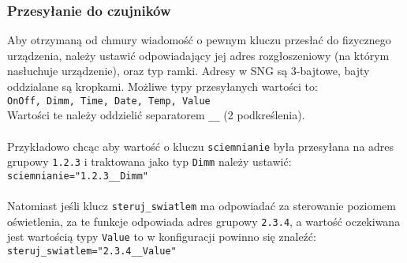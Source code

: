 \documentclass[11pt]{article}
\begin{document}
\subsubsection{Przesyłanie do czujników}
Aby otrzymaną od chmury wiadomość o pewnym kluczu przesłać do fizycznego urządzenia,
należy ustawić odpowiadający jej adres rozgłoszeniowy (na którym nasłuchuje urządzenie), 
oraz typ ramki. Adresy w SNG są 3-bajtowe, bajty oddzialane są kropkami. 
Możliwe typy przesyłanych wartości to:\\
\verb|OnOff, Dimm, Time, Date, Temp, Value|\\
Wartości te należy oddzielić separatorem \verb|__| (2 podkreślenia).\\
\\
Przykładowo chcąc aby wartość o kluczu \verb|sciemnianie| była przesyłana na adres
grupowy \verb|1.2.3| i traktowana jako typ \verb|Dimm| należy ustawić:\\
\verb|sciemnianie="1.2.3__Dimm"|\\
\\
Natomiast jeśli klucz \verb|steruj_swiatlem| ma odpowiadać za sterowanie poziomem oświetlenia,
za te funkcje odpowiada adres grupowy \verb|2.3.4|, a wartość oczekiwana jest wartością typy
\verb|Value| to w konfiguracji powinno się znaleźć:\\
\verb|steruj_swiatlem="2.3.4__Value"|\\
\end{document}
